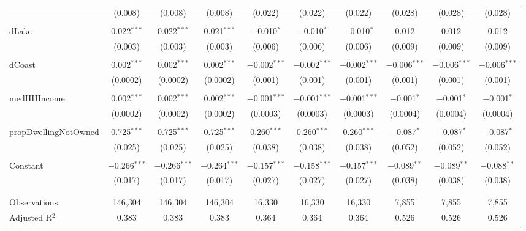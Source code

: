 \documentclass{article}
\begin{document}
\begin{table}[!htbp]
\begin{tabular}{@{\extracolsep{5pt}}lccccccccc}
  & (0.008) & (0.008) & (0.008) & (0.022) & (0.022) & (0.022) & (0.028) & (0.028) & (0.028) \\ 
  & & & & & & & & & \\ 
 dLake & 0.022$^{***}$ & 0.022$^{***}$ & 0.021$^{***}$ & $-$0.010$^{*}$ & $-$0.010$^{*}$ & $-$0.010$^{*}$ & 0.012 & 0.012 & 0.012 \\ 
  & (0.003) & (0.003) & (0.003) & (0.006) & (0.006) & (0.006) & (0.009) & (0.009) & (0.009) \\ 
  & & & & & & & & & \\ 
 dCoast & 0.002$^{***}$ & 0.002$^{***}$ & 0.002$^{***}$ & $-$0.002$^{***}$ & $-$0.002$^{***}$ & $-$0.002$^{***}$ & $-$0.006$^{***}$ & $-$0.006$^{***}$ & $-$0.006$^{***}$ \\ 
  & (0.0002) & (0.0002) & (0.0002) & (0.001) & (0.001) & (0.001) & (0.001) & (0.001) & (0.001) \\ 
  & & & & & & & & & \\ 
 medHHIncome & 0.002$^{***}$ & 0.002$^{***}$ & 0.002$^{***}$ & $-$0.001$^{***}$ & $-$0.001$^{***}$ & $-$0.001$^{***}$ & $-$0.001$^{*}$ & $-$0.001$^{*}$ & $-$0.001$^{*}$ \\ 
  & (0.0002) & (0.0002) & (0.0002) & (0.0003) & (0.0003) & (0.0003) & (0.0004) & (0.0004) & (0.0004) \\ 
  & & & & & & & & & \\ 
 propDwellingNotOwned & 0.725$^{***}$ & 0.725$^{***}$ & 0.725$^{***}$ & 0.260$^{***}$ & 0.260$^{***}$ & 0.260$^{***}$ & $-$0.087$^{*}$ & $-$0.087$^{*}$ & $-$0.087$^{*}$ \\ 
  & (0.025) & (0.025) & (0.025) & (0.038) & (0.038) & (0.038) & (0.052) & (0.052) & (0.052) \\ 
  & & & & & & & & & \\ 
 Constant & $-$0.266$^{***}$ & $-$0.266$^{***}$ & $-$0.264$^{***}$ & $-$0.157$^{***}$ & $-$0.158$^{***}$ & $-$0.157$^{***}$ & $-$0.089$^{**}$ & $-$0.089$^{**}$ & $-$0.088$^{**}$ \\ 
  & (0.017) & (0.017) & (0.017) & (0.027) & (0.027) & (0.027) & (0.038) & (0.038) & (0.038) \\ 
  & & & & & & & & & \\ 
\hline \\[-1.8ex] 
Observations & 146,304 & 146,304 & 146,304 & 16,330 & 16,330 & 16,330 & 7,855 & 7,855 & 7,855 \\ 
Adjusted R$^{2}$ & 0.383 & 0.383 & 0.383 & 0.364 & 0.364 & 0.364 & 0.526 & 0.526 & 0.526 \\ 

\end{tabular}
\end{table}
\end{document}
